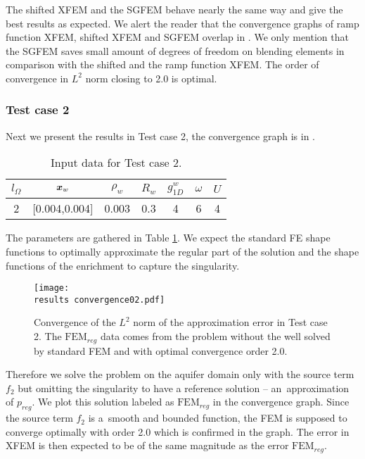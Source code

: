 The shifted XFEM and the SGFEM behave nearly the same way and give the best results as expected.
We alert the reader that the convergence graphs of ramp function XFEM, shifted XFEM and SGFEM overlap in .
We only mention that the SGFEM saves small amount of degrees of freedom on blending elements in comparison
with the shifted and the ramp function XFEM. The order of convergence in $L^2$ norm closing to 2.0 is optimal.


\subsubsection{Test case 2}
Next we present the results in Test case 2, the convergence graph is in .
%
\begin{table}[!htb]
\begin{center}
\begin{tabular}{ccccccc}
\toprule
$l_\Omega$ & $\mathbf{\boldsymbol{x}}_w$  & $\rho_w$ & $R_w$ & $g^w_{1D}$ & $\omega$ & $U$ \\
\midrule
2 & [0.004,0.004] & 0.003 & 0.3 & 4 & 6 & 4\\
\bottomrule
\end{tabular}
\caption{Input data for Test case 2.}
\label{tab:test_case_2_data}
\end{center}
\end{table}
%
The parameters are gathered in Table \ref{tab:test_case_2_data}.
We expect the standard FE shape functions to optimally approximate the regular part of the solution
and the shape functions of the enrichment to capture the singularity.
%
\begin{figure}[!htb]
  \centering    
  \texttt{[image: \\results convergence02.pdf]}
  \caption[Convergence graph in Test case 2]{Convergence of the $L^2$ norm of the approximation error in Test case 2. The $\textrm{FEM}_{reg}$
  data comes from the problem without the well solved by standard FEM and with optimal convergence order 2.0.}
  \label{fig:convergence02}
\end{figure}
%
Therefore we solve the problem on the aquifer domain only with the source term $f_2$ but omitting the singularity
to have a reference solution -- an~approximation of $p_{reg}$. We plot this solution labeled as $\textrm{FEM}_{reg}$ in the convergence graph.
Since the source term $f_2$ is a~smooth and bounded function, the FEM is supposed to converge optimally with order 2.0
which is confirmed in the graph.
The error in XFEM is then expected to be of the same magnitude as the error $\textrm{FEM}_{reg}$.

